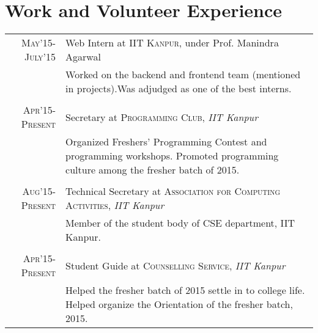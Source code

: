 \documentclass[11pt,a4paper]{article}
\begin{document}
\begin {itemize}


\end{itemize}

\section*{Work and Volunteer Experience}
\begin{tabular}{r|p{14cm}}
\textsc{May'15-July'15} & Web Intern at \textsc{IIT Kanpur}, under Prof. Manindra Agarwal\\
                        &\footnotesize{Worked on the backend and frontend team (mentioned in projects).\newline Was adjudged as one of the best interns.}\\\multicolumn{2}{c}{} \\

\textsc{Apr'15-Present} & Secretary at \textsc{Programming Club}, \emph{IIT Kanpur}\\
&\footnotesize{Organized Freshers' Programming Contest and programming workshops. \newline Promoted programming culture among the fresher batch of 2015.}\\\multicolumn{2}{c}{} \\

\textsc{Aug'15-Present} & Technical Secretary at \textsc{\newline Association for Computing Activities}, \emph{IIT Kanpur}\\
&\footnotesize{Member of the student body of CSE department, IIT Kanpur.}\\\multicolumn{2}{c}{} \\

\textsc{Apr'15-Present} & Student Guide at \textsc{Counselling Service}, \emph{IIT Kanpur}\\
&\footnotesize{Helped the fresher batch of 2015 settle in to college life. \newline Helped organize the Orientation of the fresher batch, 2015.}

\end{tabular}
\end{document}

